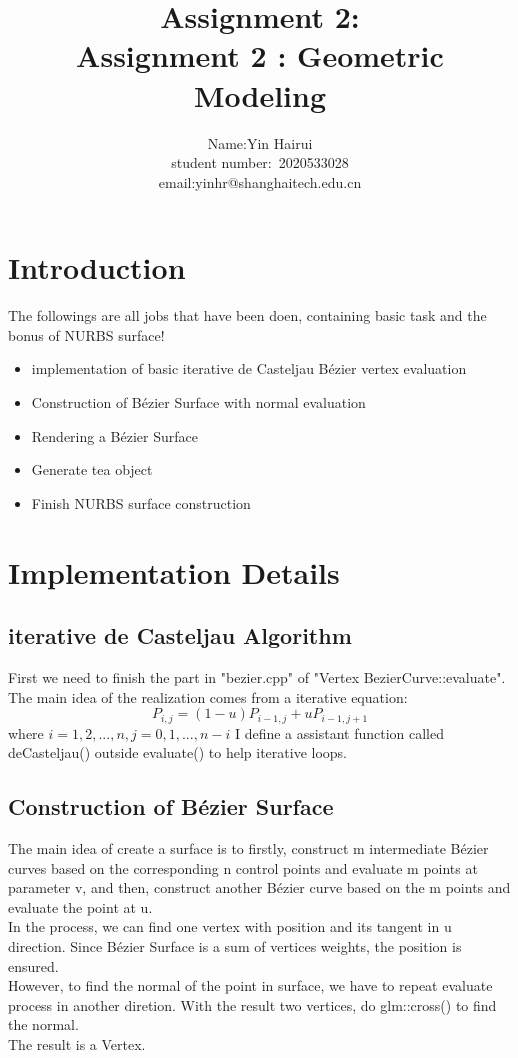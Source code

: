 \documentclass[acmtog]{acmart}
\title{Assignment 2:\\ {Assignment 2 : Geometric Modeling}}
\author{Name:\quad Yin Hairui  \\ student number:\ 2020533028
\\email:\quad yinhr@shanghaitech.edu.cn}
\begin{document}
\maketitle

\vspace*{2 ex}

\section{Introduction}
The followings are all jobs that have been doen, containing basic task and the bonus of NURBS surface!
\begin{itemize}
\item implementation of basic iterative de Casteljau Bézier vertex evaluation
\item  Construction of Bézier Surface with normal evaluation
\item Rendering a Bézier Surface
\item Generate tea object
\item Finish NURBS surface construction
\end{itemize}
\section{Implementation Details}
\subsection{iterative de Casteljau Algorithm}
First we need to finish the part in "bezier.cpp" of "Vertex BezierCurve::evaluate". The main idea of the realization comes from a iterative equation:
$$P_{i,j}=(1-u)P_{i-1,j}+uP_{i-1,j+1}$$
where $i=1,2,...,n,j=0,1,...,n-i$
\newline
I define a assistant function called deCasteljau() outside evaluate() to help iterative loops.
\subsection{Construction of Bézier Surface}
The main idea of create a surface is to firstly, construct m intermediate Bézier curves based on the corresponding n control points and evaluate m points at parameter v, and then, construct another Bézier curve based on the m points and evaluate the point at u.\\
In the process, we can find one vertex with position and its tangent in u direction. Since Bézier Surface is a sum of vertices weights, the position is ensured.\\
However, to find the normal of the point in surface, we have to repeat evaluate process in another diretion. With the result two vertices, do glm::cross() to find the normal.\\
The result is a Vertex.
\end{document}
